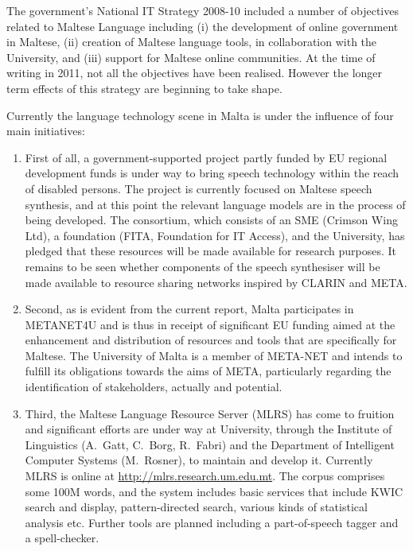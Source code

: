 \begin{multicols}{2}
The government’s National IT Strategy 2008-10 included a number of objectives related to Maltese Language including (i) the development of online government in Maltese, (ii) creation of Maltese language tools, in collaboration with the University, and (iii) support for Maltese online communities. At the time of writing in 2011, not all the objectives have been realised. However the longer term effects of this strategy are beginning to take shape. 

Currently the language technology scene in Malta is under the influence of four main initiatives:
\begin{enumerate}
\item First of all, a government-supported project partly funded by EU regional development funds is under way to bring speech technology within the reach of disabled persons. The project is currently focused on Maltese speech synthesis, and at this point the relevant language models are in the process of being developed. The consortium, which consists of an SME (Crimson Wing Ltd), a foundation (FITA, Foundation for IT Access), and the University, has pledged that these resources will be made available for research purposes. It remains to be seen whether components of the speech synthesiser will be made available to resource sharing networks inspired by CLARIN and META.

\item Second, as is evident from the current report, Malta participates in METANET4U and is thus in receipt of significant EU funding aimed at the enhancement and distribution of resources and tools that are specifically for Maltese. The University of Malta is a member of META-NET and intends to fulfill its obligations towards the aims of META, particularly regarding the identification of stakeholders, actually and potential. 

\item Third, the Maltese Language Resource Server (MLRS) \cite{Rosner-et-al:2006, MLRS1} has come to fruition and significant efforts are under way at University, through the Institute of Linguistics (A.~Gatt, C.~Borg, R.~Fabri) and the Department of Intelligent Computer Systems (M.~Rosner), to maintain and develop it. Currently MLRS is online at \url{http://mlrs.research.um.edu.mt}. The corpus comprises some 100M words, and the system includes basic services that include KWIC search and display, pattern-directed search, various kinds of statistical analysis etc. Further tools are planned including a part-of-speech tagger and a spell-checker.


\end{enumerate}
\end{multicols}
